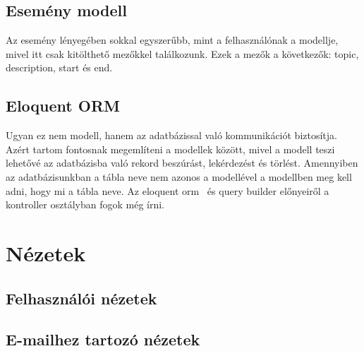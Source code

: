 \documentclass[
]{thesis-ekf}
\theoremstyle{definition}
\theoremstyle{remark}
\begin{document}
\subsection{Esemény modell}
Az esemény lényegében sokkal egyszerűbb, mint a felhasználónak a modellje, mivel itt csak kitölthető mezőkkel találkozunk. Ezek a mezők a következők: topic, description, start és end.

\subsection{Eloquent ORM}
Ugyan ez nem modell, hanem az adatbázissal való kommunikációt biztosítja. Azért tartom fontosnak megemlíteni a modellek között, mivel a modell teszi lehetővé az adatbázisba való rekord beszúrást, lekérdezést és törlést. Amennyiben az adatbázisunkban a tábla neve nem azonos a modellével a modellben meg kell adni, hogy mi a tábla neve. Az eloquent orm~\cite{laravel_eloquent} és query builder előnyeiről a kontroller osztályban fogok még írni.

\section{Nézetek}

\subsection{Felhasználói nézetek}

\subsection{E-mailhez tartozó nézetek}
\end{document}
